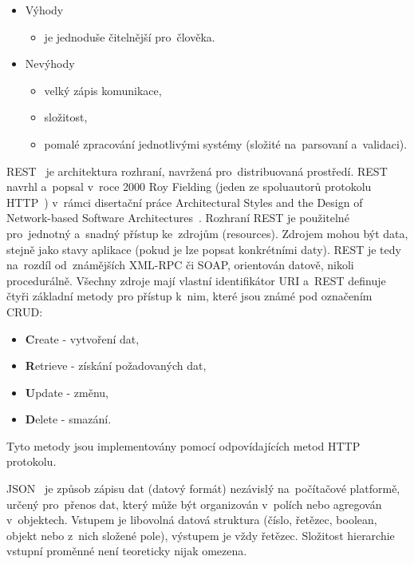 \begin{itemize}
	\setlength{\parskip}{0pt}
	\setlength{\itemsep}{0pt}
	\item {Výhody}
	\begin{itemize}
		\setlength{\parskip}{0pt}
		\setlength{\itemsep}{0pt}
		\item {je jednoduše čitelnější pro~člověka.}
	\end{itemize}	
	
	\item {Nevýhody}
	\begin{itemize}
		\setlength{\parskip}{0pt}
		\setlength{\itemsep}{0pt}
		\item {velký zápis komunikace,}
		\item {složitost,}
		\item {pomalé zpracování jednotlivými systémy (složité na~parsovaní a~validaci).}
	\end{itemize}
\end{itemize}

REST~\cite{rest} je architektura rozhraní, navržená pro~distribuovaná prostředí. REST navrhl a~popsal v~roce 2000 Roy Fielding (jeden ze spoluautorů protokolu HTTP~\cite{http}) v~rámci disertační práce Architectural Styles and the Design of Network-based Software Architectures~\cite{rest-publication}. Rozhraní REST je použitelné pro~jednotný a~snadný přístup ke~zdrojům (resources). Zdrojem mohou být data, stejně jako stavy aplikace (pokud je lze popsat konkrétními daty). REST je tedy na~rozdíl od~známějších XML-RPC či SOAP, orientován datově, nikoli procedurálně. Všechny zdroje mají vlastní identifikátor URI a~REST definuje čtyři základní metody pro přístup k~nim, které jsou známé pod označením CRUD:
\begin{itemize}
	\setlength{\parskip}{0pt}
	\setlength{\itemsep}{0pt}
	\item {\textbf{C}reate - vytvoření dat,}
	\item {\textbf{R}etrieve - získání požadovaných dat,}
	\item {\textbf{U}pdate - změnu,}
	\item {\textbf{D}elete - smazání.}
\end{itemize} 
Tyto metody jsou implementovány pomocí odpovídajících metod HTTP protokolu.

JSON~\cite{json} je způsob zápisu dat (datový formát) nezávislý na~počítačové platformě, určený pro~přenos dat, který může být organizován v~polích nebo agregován v~objektech. Vstupem je libovolná datová struktura (číslo, řetězec, boolean, objekt nebo z~nich složené pole), výstupem je vždy řetězec. Složitost hierarchie vstupní proměnné není teoreticky nijak omezena. 

